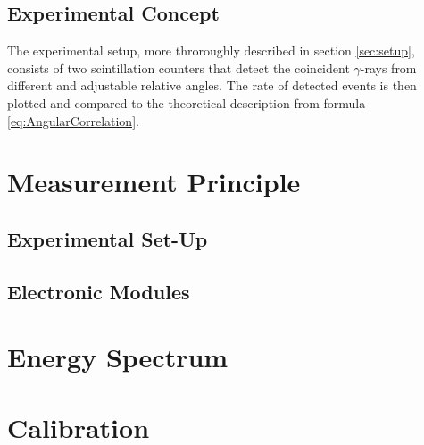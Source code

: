 \documentclass[a4paper,parskip,11pt, DIV12]{scrreprt}
\begin{document}
\section{Experimental Concept}

		The experimental setup, more throroughly described in section \ref{sec:setup}, consists of two scintillation counters that detect the coincident $\gamma$-rays from different and adjustable relative angles. The rate of detected events is then plotted and compared to the theoretical description from formula \ref{eq:AngularCorrelation}.
		
\chapter{Measurement Principle}	

\section{Experimental Set-Up}

\section{Electronic Modules}

\chapter{Energy Spectrum}

\chapter{Calibration}
\end{document}
